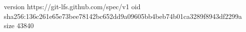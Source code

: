 version https://git-lfs.github.com/spec/v1
oid sha256:136c261e65e73bee78142bc652dd9a09605bb4beb74b01ca3289f8943df2299a
size 43840
